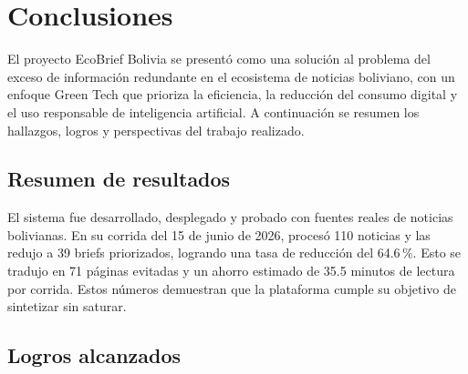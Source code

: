 \chapter*{Conclusiones}

El proyecto EcoBrief Bolivia se present\'o como una soluci\'on al problema del exceso de informaci\'on redundante en el ecosistema de noticias boliviano, con un enfoque Green Tech que prioriza la eficiencia, la reducci\'on del consumo digital y el uso responsable de inteligencia artificial. A continuaci\'on se resumen los hallazgos, logros y perspectivas del trabajo realizado.

\section*{Resumen de resultados}

El sistema fue desarrollado, desplegado y probado con fuentes reales de noticias bolivianas. En su corrida del 15 de junio de 2026, proces\'o 110 noticias y las redujo a 39 briefs priorizados, logrando una tasa de reducci\'on del 64.6\,\%. Esto se tradujo en 71 p\'aginas evitadas y un ahorro estimado de 35.5 minutos de lectura por corrida. Estos n\'umeros demuestran que la plataforma cumple su objetivo de sintetizar sin saturar.

\section*{Logros alcanzados}

